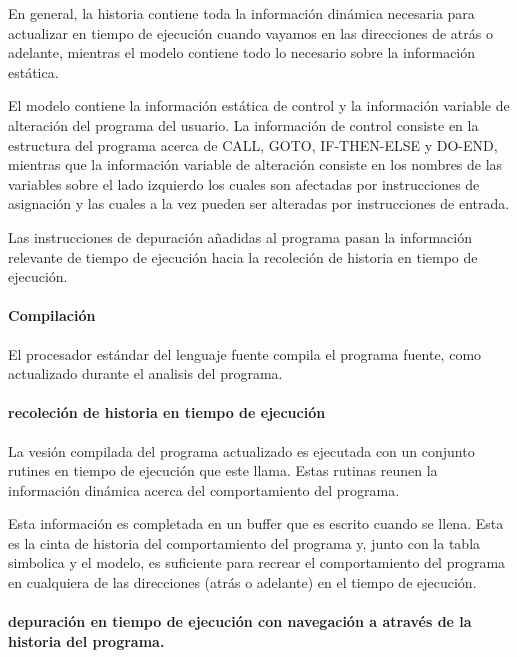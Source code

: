 \documentclass[12pt,a4paper]{report}
\begin{document}
En general, la historia contiene toda la información dinámica necesaria para actualizar en tiempo de ejecución cuando vayamos en las direcciones de atrás o adelante, mientras el modelo contiene todo lo necesario sobre la información estática.

El modelo contiene la información estática de control y la información variable de alteración del programa del usuario.  La información de control consiste en la estructura del programa acerca de CALL, GOTO, IF-THEN-ELSE y DO-END, mientras que la información variable de alteración consiste en los nombres de las variables sobre el lado izquierdo los cuales son afectadas por instrucciones de asignación y las cuales a la vez pueden ser alteradas por instrucciones de entrada.

Las instrucciones de depuración añadidas al programa pasan la información relevante de tiempo de ejecución hacia  la recoleción de historia en tiempo de ejecución.

				\paragraph{Compilación}

El procesador estándar del lenguaje fuente compila el programa fuente, como actualizado durante el analisis del programa.

				\paragraph[Recolección de historia]{recoleción de historia en tiempo de ejecución}

La vesión compilada del programa actualizado es ejecutada con un conjunto rutines en tiempo de ejecución que este llama.  Estas rutinas reunen la información dinámica acerca del comportamiento del programa.

Esta información es completada en un buffer que es escrito cuando se llena.  Esta es la cinta de historia del comportamiento del programa y, junto con la tabla simbolica y el modelo, es suficiente para recrear el comportamiento del programa en cualquiera de las direcciones (atrás o adelante) en el tiempo de ejecución.

				\paragraph[Historia del programa]{depuración en tiempo de ejecución con navegación a através de la historia del programa.}
\end{document}
